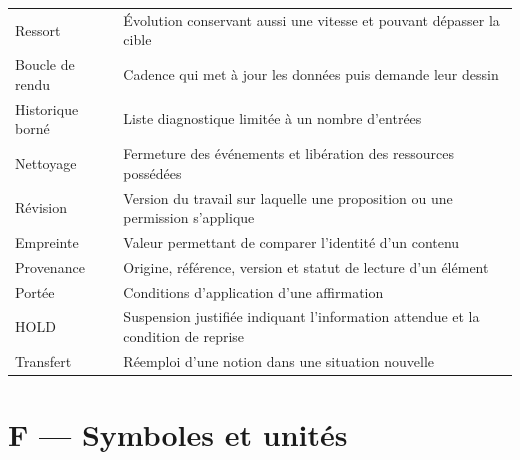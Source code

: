 \documentclass[
  canadien,
  11pt,
  a4paper,
]{report}
\begin{document}
{\begin{longtable}[]{@{}
  >{\raggedright\arraybackslash}p{}
  >{\raggedright\arraybackslash}p{}@{}}
Ressort & Évolution conservant aussi une vitesse et pouvant dépasser la
cible \\
Boucle de rendu & Cadence qui met à jour les données puis demande leur
dessin \\
Historique borné & Liste diagnostique limitée à un nombre d'entrées \\
Nettoyage & Fermeture des événements et libération des ressources
possédées \\
Révision & Version du travail sur laquelle une proposition ou une
permission s'applique \\
Empreinte & Valeur permettant de comparer l'identité d'un contenu \\
Provenance & Origine, référence, version et statut de lecture d'un
élément \\
Portée & Conditions d'application d'une affirmation \\
HOLD & Suspension justifiée indiquant l'information attendue et la
condition de reprise \\
Transfert & Réemploi d'une notion dans une situation nouvelle \\
\end{longtable}
}

\section{F --- Symboles et unités}\label{f-symboles-et-unituxe9s}
\end{document}

